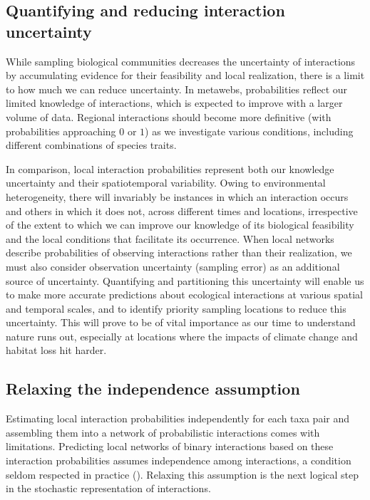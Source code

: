 \subsection{Quantifying and reducing interaction uncertainty} 

While sampling biological communities decreases the uncertainty of interactions
by accumulating evidence for their feasibility and local realization, there is a
limit to how much we can reduce uncertainty. In metawebs, probabilities reflect
our limited knowledge of interactions, which is expected to improve with a
larger volume of data. Regional interactions should become more definitive (with
probabilities approaching $0$ or $1$) as we investigate various conditions,
including different combinations of species traits. 

In comparison, local interaction probabilities represent both our knowledge
uncertainty and their spatiotemporal variability. Owing to environmental
heterogeneity, there will invariably be instances in which an interaction occurs
and others in which it does not, across different times and locations,
irrespective of the extent to which we can improve our knowledge of its
biological feasibility and the local conditions that facilitate its occurrence.
When local networks describe probabilities of observing interactions rather than
their realization, we must also consider observation uncertainty (sampling
error) as an additional source of uncertainty. Quantifying and partitioning this
uncertainty will enable us to make more accurate predictions about ecological
interactions at various spatial and temporal scales, and to identify priority
sampling locations to reduce this uncertainty. This will prove to be of vital
importance as our time to understand nature runs out, especially at locations
where the impacts of climate change and habitat loss hit harder.

\subsection{Relaxing the independence assumption} 

Estimating local interaction probabilities independently for each taxa pair and
assembling them into a network of probabilistic interactions comes with
limitations. Predicting local networks of binary interactions based on these
interaction probabilities assumes independence among interactions, a condition
seldom respected in practice (\cite{Golubski2011Modifying}). Relaxing this
assumption is the next logical step in the stochastic representation of
interactions. 

